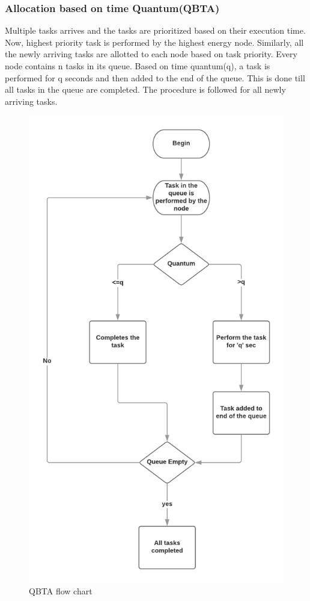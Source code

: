 \documentclass[conference]{IEEEtran}
\begin{document}
\subsubsection{Allocation based on time Quantum(QBTA)}
Multiple tasks arrives and the tasks are prioritized based on their execution time. Now, highest priority task is performed by the highest energy node. Similarly, all the newly arriving tasks are allotted to each node based on task priority. Every node contains n tasks in its queue. Based on time quantum(q), a task is performed for q seconds and then added to the end of the queue. This is done till all tasks in the queue are completed. The procedure is followed for all newly arriving tasks.
\begin{figure}[H]
\includegraphics[width=\linewidth]{QBTA.png}
  \caption{QBTA flow chart}
  \label{fig:2}
\end{figure}
\end{document}
